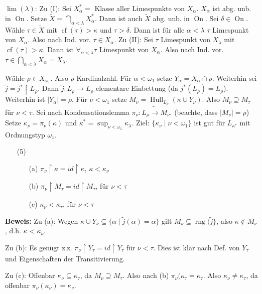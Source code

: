 \documentclass[a4paper,fontsize=11pt]{scrartcl}
\newcommand{\rng}{\operatorname{rng}}
\newcommand{\On}{\operatorname{On}}
\newcommand{\cf}{\operatorname{cf}}
\newcommand{\Hull}{\operatorname{Hull}}
\begin{document}
			$\lim(\lambda)$: Zu (I): Sei $X^*_{\alpha}=$ Klasse aller Limespunkte von $X_{\alpha}$. 
			$X_{\alpha}$ ist abg. unb. in $\On$.
			Setze $\tilde X=\bigcap_{\alpha<\lambda}X^*_{\alpha}$.
			Dann ist auch $\tilde X$ abg. unb. in $\On$.
			Sei $\delta \in \On$.
			Wähle $\tau\in\tilde X$ mit $\cf(\tau)>\kappa$ und $\tau>\delta$.
			Dann ist für alle $\alpha<\lambda$ $\tau$ Limespunkt von $X_{\alpha}$.
			Also nach Ind. vor. $\tau\in X_{\alpha}$.
			Zu (II): Sei $\tau$ Limespunkt von $X_{\lambda}$ mit $\cf(\tau)>\kappa$.
			Dann ist $\forall_{\alpha<\lambda} \tau$ Limespunkt von $X_{\alpha}$.
			Also nach Ind. vor. $\tau\in \bigcap_{\alpha<\lambda} X_{\alpha}=X_{\lambda}$.
			
		Wähle $\rho\in X_{\omega_1}$.
		Also $\rho$ Kardinalzahl.
		Für $\alpha<\omega_1$ setze $Y_{\alpha}=X_{\alpha}\cap\rho$.
		Weiterhin sei $\tilde j=j^*\upharpoonright L_{\rho}$.
		Dann $\tilde j\colon L_{\rho}\to L_{\rho}$ elementare Einbettung (da $j^*(L_{\rho})=L_{\rho}$).
		Weiterhin ist $|Y_{\alpha}|=\rho$.
		Für $\nu<\omega_1$ setze $M_{\nu}= \Hull_{L_{\rho}}(\kappa\cup Y_{\nu})$.
		Also $M_{\nu}\supseteq M_{\tau}$ für $\nu<\tau$.
		Sei nach Kondensationslemma $\pi_{\nu}\colon L_{\rho}\tilde\to M_{\nu}$.
		(beachte, dass $|M_{\nu}|=\rho$)
		Setze $\kappa_{\nu}=\pi_{\nu}(\kappa)$ und $\kappa^*=\sup_{\nu<\omega_1} \kappa_{\lambda}$.
		Ziel: $\{\kappa_{\nu}\mid \nu<\omega_1\}$ ist gut für $L_{\kappa^*}$ mit Ordnungstyp $\omega_1$.
		\begin{itemize}
			\item[(5)] \begin{itemize}
					\item[(a)] $\pi_{\nu}\upharpoonright\kappa=id\upharpoonright\kappa$, $\kappa<\kappa_{\nu}$
					\item[(b)] $\pi_{\nu}\upharpoonright M_{\tau}=id\upharpoonright M_{\tau}$, für $\nu<\tau$
					\item[(c)] $\kappa_{\nu}<\kappa_{\tau}$, für $\nu<\tau$						
			\end{itemize}
		\end{itemize}
		{\bf Beweis:} Zu (a): Wegen $\kappa\cup Y_{\nu}\subseteq\{\alpha\mid \tilde j(\alpha)=\alpha\}$ gilt 
			$M_{\nu}\subseteq\rng(\tilde j\}$, also $\kappa\not\in M_{\nu}$, d.h. $\kappa<\kappa_{\nu}$.

			Zu (b): Es genügt z.z. $\pi_{\nu}\upharpoonright Y_{\tau}=id\upharpoonright Y_{\tau}$ für $\nu<\tau$.
			Dies ist klar nach Def. von $Y_{\tau}$ und Eigenschaften der Transitivierung.

			Zu (c): Offenbar $\kappa_{\nu}\subseteq\kappa_{\tau}$, da $M_{\nu}\supseteq M_{\tau}$.
			Also nach (b) $\pi_{\nu}(\kappa_{\tau}=\kappa_{\tau}$.
			Also $\kappa_{\nu}\neq\kappa_{\tau}$, da offenbar $\pi_{\nu}(\kappa_{\nu})=\kappa_{\nu}$.
\end{document}
